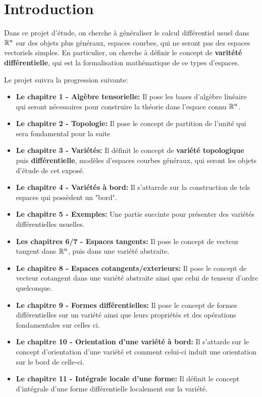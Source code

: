 \setcounter{chapter}{-1}
\chapter{Introduction}
   Dans ce projet d'étude, on cherche à généraliser le calcul différentiel usuel dans \( \mathbb{R}^n \) sur des objets plus généraux, espaces courbes, qui ne seront pas des espaces vectoriels simples. En particulier, on cherche à définir le concept de \textbf{varitété différentielle}, qui est la formalisation mathématique de ce types d'espaces.\< 
   
   Le projet suivra la progression suivante:
   \begin{itemize}
      \item \textbf{Le chapitre 1 - Algèbre tensorielle:} Il pose les bases d'algèbre linéaire qui seront nécessaires pour construire la théorie dans l'espace connu \( \mathbb{R}^n \).
      \item \textbf{Le chapitre 2 - Topologie:} Il pose le concept de partition de l'unité qui sera fondamental pour la suite
      \item \textbf{Le chapitre 3 - Variétés:} Il définit le concept de \textbf{variété topologique} puis \textbf{différentielle}, modèles d'espaces courbes généraux, qui seront les objets d'étude de cet exposé. 
      \item \textbf{Le chapitre 4 - Variétés à bord:} Il s'attarrde sur la construction de tels espaces qui possèdent un "bord".
      \item \textbf{Le chapitre 5 - Exemples:} Une partie succinte pour présenter des variétés différentielles usuelles.
      \item \textbf{Les chapitres 6/7 - Espaces tangents:} Il pose le concept de vecteur tangent dans \( \mathbb{R}^n \), puis dans une variété abstraite.
      \item \textbf{Le chapitre 8 - Espaces cotangents/exterieurs:} Il pose le concept de vecteur cotangent dans une variété abstraite ainsi que celui de tenseur d'ordre quelconque.
      \item \textbf{Le chapitre 9 - Formes différentielles:} Il pose le concept de formes différentielles sur un variété ainsi que leurs propriétés et des opérations fondamentales sur celles ci.
      \item \textbf{Le chapitre 10 - Orientation d'une variété à bord:} Il s'attarde sur le concept d'orientation d'une variété et comment celui-ci induit une orientation sur le bord de celle-ci.
      \item \textbf{Le chapitre 11 - Intégrale locale d’une forme:} Il  définit le concept d'intégrale d'une forme différentielle localement sur la variété.

\end{itemize}
